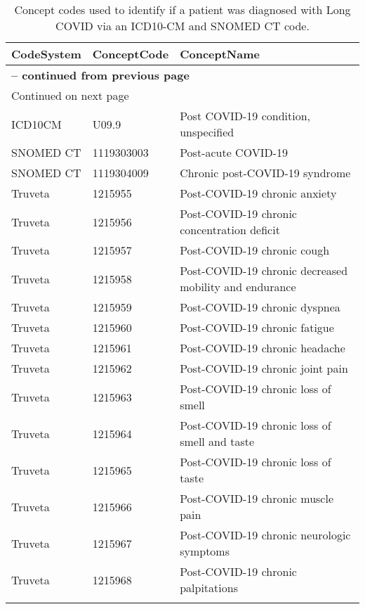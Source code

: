 \begin{longtable}{p{}p{}p{}}
\caption{Concept codes used to identify if a patient was diagnosed with Long COVID via an ICD10-CM and SNOMED CT code.} \\ 
 CodeSystem & ConceptCode & ConceptName \\ 
  \hline 
\endfirsthead 
\multicolumn{3}{p{\textwidth}}{{ \bfseries \tablename \thetable{} -- continued from previous page}} \ 
\hline CodeSystem & ConceptCode & ConceptName \\ \hline 
\endhead 
\hline \multicolumn{3}{p{\textwidth}}{{Continued on next page}} \\ \hline 
\endfoot 
\hline 
\endlastfoot 
 \hline
ICD10CM & U09.9 & Post COVID-19 condition, unspecified \\ 
  SNOMED CT & 1119303003 & Post-acute COVID-19 \\ 
  SNOMED CT & 1119304009 & Chronic post-COVID-19 syndrome \\ 
  Truveta & 1215955 & Post-COVID-19 chronic anxiety \\ 
  Truveta & 1215956 & Post-COVID-19 chronic concentration deficit \\ 
  Truveta & 1215957 & Post-COVID-19 chronic cough \\ 
  Truveta & 1215958 & Post-COVID-19 chronic decreased mobility and endurance \\ 
  Truveta & 1215959 & Post-COVID-19 chronic dyspnea \\ 
  Truveta & 1215960 & Post-COVID-19 chronic fatigue \\ 
  Truveta & 1215961 & Post-COVID-19 chronic headache \\ 
  Truveta & 1215962 & Post-COVID-19 chronic joint pain \\ 
  Truveta & 1215963 & Post-COVID-19 chronic loss of smell \\ 
  Truveta & 1215964 & Post-COVID-19 chronic loss of smell and taste \\ 
  Truveta & 1215965 & Post-COVID-19 chronic loss of taste \\ 
  Truveta & 1215966 & Post-COVID-19 chronic muscle pain \\ 
  Truveta & 1215967 & Post-COVID-19 chronic neurologic symptoms \\ 
  Truveta & 1215968 & Post-COVID-19 chronic palpitations \\ 
  \hline
\label{tab:codes_long_covid_concept}
\end{longtable}
